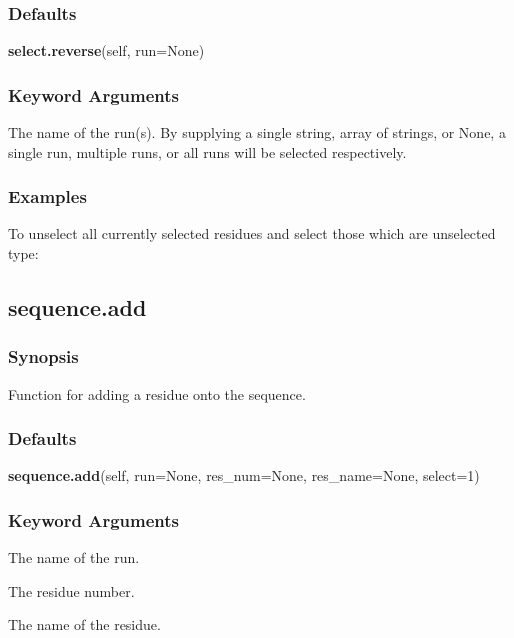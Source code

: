 \subsubsection{Defaults}

\textsf{\textbf{select.reverse}(self, run=None)}


\subsubsection{Keyword Arguments}


  The name of the run(s).  By supplying a single string, array of strings, or None, a single run, multiple runs, or all runs will be selected respectively.

\subsubsection{Examples}

To unselect all currently selected residues and select those which are unselected type:




\newpage

\subsection{sequence.add}


\subsubsection{Synopsis}

Function for adding a residue onto the sequence.

\subsubsection{Defaults}

\textsf{\textbf{sequence.add}(self, run=None, res\_num=None, res\_name=None, select=1)}


\subsubsection{Keyword Arguments}


  The name of the run.

  The residue number.

  The name of the residue.

